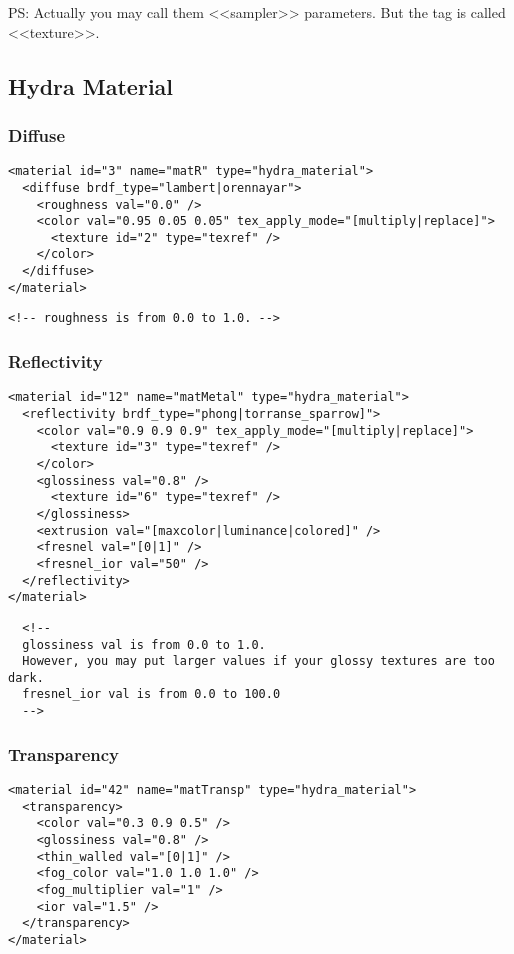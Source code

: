 \documentclass[a4paper,11pt]{report}
\begin{document}
PS: Actually you may call them <<sampler>> parameters. But the tag is called <<texture>>.

\subsection{Hydra Material}

\subsubsection{Diffuse}
\lstset{language=XML}
\begin{lstlisting}
<material id="3" name="matR" type="hydra_material">
  <diffuse brdf_type="lambert|orennayar">
    <roughness val="0.0" />
    <color val="0.95 0.05 0.05" tex_apply_mode="[multiply|replace]">    
      <texture id="2" type="texref" />
    </color>
  </diffuse>
</material>
\end{lstlisting}

\lstset{language=XML}
\begin{lstlisting}
<!-- roughness is from 0.0 to 1.0. -->
\end{lstlisting} 

\subsubsection{Reflectivity}
\lstset{language=XML}
\begin{lstlisting}
<material id="12" name="matMetal" type="hydra_material">
  <reflectivity brdf_type="phong|torranse_sparrow]">
    <color val="0.9 0.9 0.9" tex_apply_mode="[multiply|replace]">
      <texture id="3" type="texref" />
    </color>
    <glossiness val="0.8" />
      <texture id="6" type="texref" />
    </glossiness>    
    <extrusion val="[maxcolor|luminance|colored]" />
    <fresnel val="[0|1]" />
    <fresnel_ior val="50" />
  </reflectivity>
</material>
\end{lstlisting}

\lstset{language=XML}
\begin{lstlisting}
  <!-- 
  glossiness val is from 0.0 to 1.0. 
  However, you may put larger values if your glossy textures are too dark.
  fresnel_ior val is from 0.0 to 100.0
  -->
\end{lstlisting}

\subsubsection{Transparency}
\lstset{language=XML}
\begin{lstlisting}
<material id="42" name="matTransp" type="hydra_material">
  <transparency>
    <color val="0.3 0.9 0.5" />
    <glossiness val="0.8" />
    <thin_walled val="[0|1]" />
    <fog_color val="1.0 1.0 1.0" />
    <fog_multiplier val="1" />
    <ior val="1.5" />
  </transparency>
</material>
\end{lstlisting}
\end{document}
